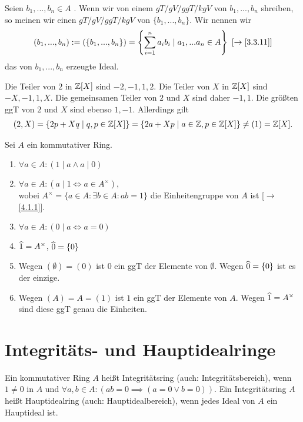 \documentclass[../../main.tex]{subfiles}
\begin{document}
\begin{spr}\label{16.1.10}
Seien $b_1,...,b_n\in A$ . Wenn wir von einem $gT/ gV/ ggT/ kgV$ von $b_1,...,b_n$ shreiben, so meinen wir einen $gT/ gV/ ggT/ kgV$ von $\{b_1,...,b_n\}$. Wir nennen wir 
\begin{align*}
(b_1,...,b_n):=(\{b_1,...,b_n\})=\left\{\sum_{i=1}^n a_ib_i\mid a_1,...a_n\in A\right\}\ [\to\ref{3.3.11}]
\end{align*}
das von $b_1,...,b_n$ erzeugte Ideal.
\end{spr}

\begin{bsp}\label{16.1.11}
Die Teiler von $2$ in $\mathbb Z[X]$ sind $-2,-1,1,2$. Die Teiler von $X$ in $\mathbb Z[X]$ sind $-X,-1,1,X$. Die gemeinsamen Teiler von $2$ und $X$ sind daher $-1,1$. Die größten ggT von $2$ und $X$ sind ebenso $1,-1$. Allerdings gilt
\begin{align*}
(2,X)=\{2p+Xq\mid q,p\in \mathbb Z[X]\}=\{2a+Xp\mid a\in \mathbb Z, p\in \mathbb Z[X]\}\neq (1)=\mathbb Z[X].
\end{align*}
\end{bsp}

\begin{bsp}\label{16.1.12}
Sei $A$ ein kommutativer Ring.
\begin{enumerate}[\normalfont(a)]
\item $\forall a\in A: (1\mid a\land a\mid 0)$
\item $\forall a\in A: (a\mid 1\Longleftrightarrow a\in A^\times)$,\\
wobei $A^\times=\{a\in A: \exists b\in A: ab=1\}$ die Einheitengruppe von $A$ ist [$\to$\ref{4.1.1}].
\item $\forall a\in A: (0\mid a\Longleftrightarrow a=0)$
\item $\widehat{1}=A^\times$, $\widehat{0}=\{0\}$
\item Wegen $(\emptyset)=(0)$ ist $0$ ein ggT der Elemente von $\emptyset$. Wegen $\widehat{0}=\{0\}$ ist es der einzige.
\item Wegen $(A)=A=(1)$ ist $1$ ein ggT der Elemente von $A$. Wegen $\widehat{1}=A^\times$ sind diese ggT genau die Einheiten.
\end{enumerate}
\end{bsp}

\section{Integritäts- und Hauptidealringe}

\begin{df}\label{16.2.1}
Ein kommutativer Ring $A$ heißt Integritätsring (auch: Integritätsbereich), wenn $1\neq 0$ in $A$ und $\forall a,b\in A: (ab=0\implies (a=0\lor b=0))$. Ein Integritätsring $A$ heißt Hauptidealring (auch: Hauptidealbereich), wenn jedes Ideal von $A$ ein Hauptideal ist.
\end{df}
\end{document}
